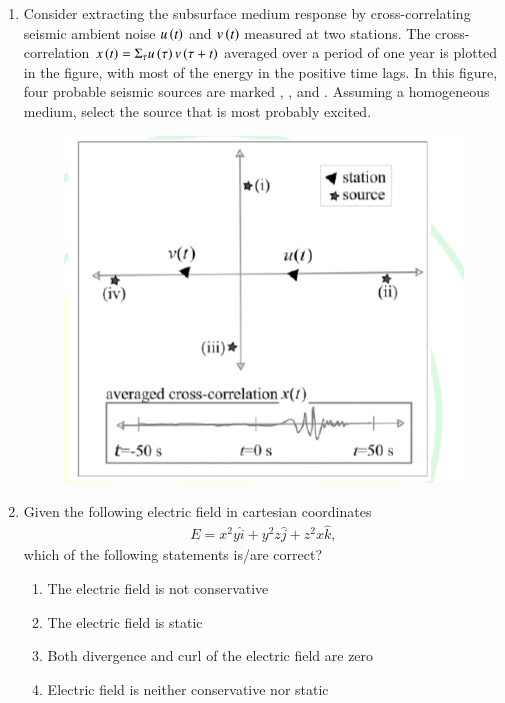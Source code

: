 \documentclass[journal,12pt,onecolumn]{IEEEtran}
\theoremstyle{remark}
\begin{document}
\begin{enumerate}
\item Consider extracting the subsurface medium response by cross-correlating seismic ambient noise $u\left(t\right)$ and $v\left(t\right)$ measured at two stations. The cross-correlation $x\left(t\right) = \Sigma_{\tau} u\left(\tau\right)v\left(\tau+t\right)$ averaged over a period of one year is plotted in the figure, with most of the energy in the positive time lags. In this figure, four probable seismic sources are marked , ,  and . Assuming a homogeneous medium, select the source that is most probably excited.
\begin{figure}[H]
    \centering
    \includegraphics[width=0.7\columnwidth]{figs/fig11.png}
    \caption{}
    \label{fig:q51}
\end{figure}
\hfill{}
\begin{enumerate}
\end{enumerate}

\item Given the following electric field in cartesian coordinates
\begin{align*}
    E = x^2y\hat{i} + y^2z\hat{j} + z^2x\hat{k},
\end{align*}
which of the following statements is/are correct? \hfill{}
\begin{enumerate}
    \item The electric field is not conservative
    \item The electric field is static
    \item Both divergence and curl of the electric field are zero
    \item Electric field is neither conservative nor static
\end{enumerate}


\end{enumerate}
\end{document}
